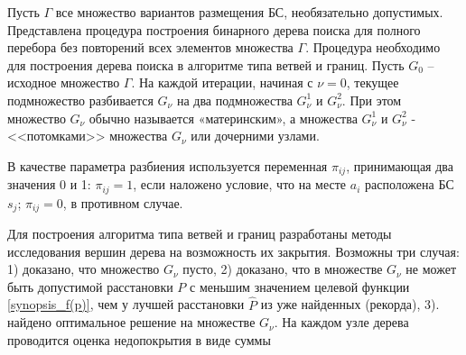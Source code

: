 Пусть $\Gamma$ все множество вариантов размещения БС, необязательно допустимых. Представлена процедура построения бинарного дерева поиска для полного перебора без повторений всех элементов множества $\Gamma$. Процедура необходимо для построения дерева поиска в алгоритме типа ветвей и границ. Пусть $G_0$ -- исходное множество $\Gamma$. На каждой итерации, начиная с $\nu=0$, текущее подмножество разбивается $G_\nu$ на два подмножества $G^1_\nu$ и $G^2_\nu$. При этом множество $G_\nu$ обычно называется «материнским», а множества $G^1_\nu$  и $G^2_\nu$  - <<потомками>> множества $G_\nu$ или дочерними узлами.





В качестве параметра разбиения используется переменная $\pi_{ij}$, принимающая два значения 0 и 1: $\pi_{ij}=1$, если наложено условие, что на месте $a_i$ расположена БС $s_j$; $\pi_{ij} = 0$, в противном случае.


Для построения алгоритма типа ветвей и границ разработаны методы исследования вершин дерева на возможность их закрытия. Возможны три случая: 1) доказано, что множество $G_\nu$ пусто, 2) доказано, что в множестве $G_\nu$ не может быть допустимой расстановки $P$ с меньшим значением целевой функции \cref{synopsis_f(p)}, чем у лучшей расстановки $\widehat{P}$ из уже найденных (рекорда), 3). найдено оптимальное решение на множестве $G_\nu$. На каждом узле дерева проводится оценка недопокрытия в виде суммы
 



